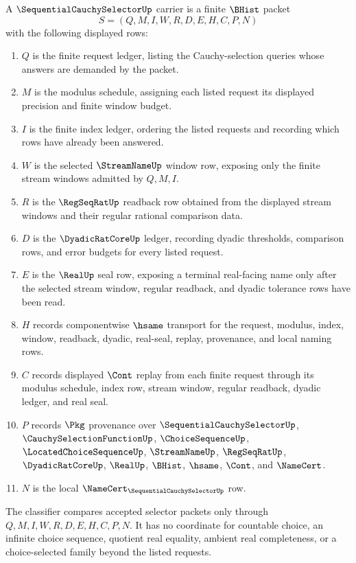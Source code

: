 \begin{definition}
\label{def:sequential-cauchy-selector-carrier}
A $\SequentialCauchySelectorUp$ carrier is a finite $\BHist$ packet
$$
S=(Q,M,I,W,R,D,E,H,C,P,N)
$$
with the following displayed rows:
\begin{enumerate}
\item $Q$ is the finite request ledger, listing the Cauchy-selection queries whose answers are demanded by the packet.
\item $M$ is the modulus schedule, assigning each listed request its displayed precision and finite window budget.
\item $I$ is the finite index ledger, ordering the listed requests and recording which rows have already been answered.
\item $W$ is the selected $\StreamNameUp$ window row, exposing only the finite stream windows admitted by $Q,M,I$.
\item $R$ is the $\RegSeqRatUp$ readback row obtained from the displayed stream windows and their regular rational comparison data.
\item $D$ is the $\DyadicRatCoreUp$ ledger, recording dyadic thresholds, comparison rows, and error budgets for every listed request.
\item $E$ is the $\RealUp$ seal row, exposing a terminal real-facing name only after the selected stream window, regular readback, and dyadic tolerance rows have been read.
\item $H$ records componentwise $\hsame$ transport for the request, modulus, index, window, readback, dyadic, real-seal, replay, provenance, and local naming rows.
\item $C$ records displayed $\Cont$ replay from each finite request through its modulus schedule, index row, stream window, regular readback, dyadic ledger, and real seal.
\item $P$ records $\Pkg$ provenance over $\SequentialCauchySelectorUp$, $\CauchySelectionFunctionUp$, $\ChoiceSequenceUp$, $\LocatedChoiceSequenceUp$, $\StreamNameUp$, $\RegSeqRatUp$, $\DyadicRatCoreUp$, $\RealUp$, $\BHist$, $\hsame$, $\Cont$, and $\NameCert$.
\item $N$ is the local $\NameCert_{\SequentialCauchySelectorUp}$ row.
\end{enumerate}
The classifier compares accepted selector packets only through $Q,M,I,W,R,D,E,H,C,P,N$. It has no coordinate for countable choice, an infinite choice sequence, quotient real equality, ambient real completeness, or a choice-selected family beyond the listed requests.
\end{definition}

